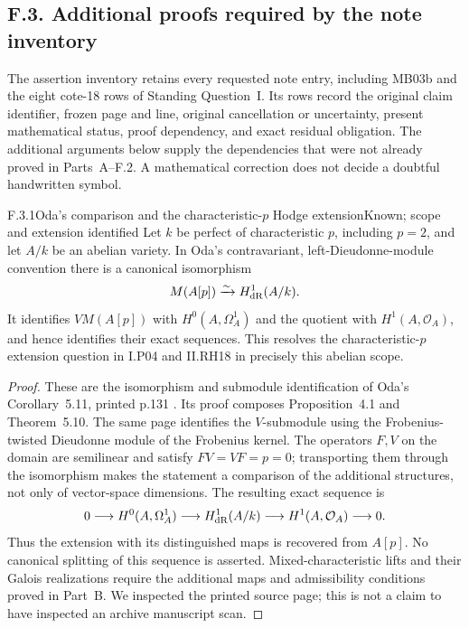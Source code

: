 \subsection{F.3. Additional proofs required by the note inventory}

The assertion inventory retains every requested note entry, including MB03b and the eight cote-18 rows of Standing Question~I. Its rows record the original claim identifier, frozen page and line, original cancellation or uncertainty, present mathematical status, proof dependency, and exact residual obligation. The additional arguments below supply the dependencies that were not already proved in Parts~A--F.2. A mathematical correction does not decide a doubtful handwritten symbol.

\begin{result}{F.3.1}{Oda's comparison and the characteristic-$p$ Hodge extension}{Known; scope and extension identified}
Let $k$ be perfect of characteristic $p$, including $p=2$, and let $A/k$ be an abelian variety. In Oda's contravariant, left-Dieudonne-module convention there is a canonical isomorphism
\[
 M(A[p])\xrightarrow{\sim}H^1_{\mathrm{dR}}(A/k).
\]
It identifies $VM(A[p])$ with $H^0(A,\Omega_A^1)$ and the quotient with $H^1(A,\mathcal O_A)$, and hence identifies their exact sequences. This resolves the characteristic-$p$ extension question in I.P04 and II.RH18 in precisely this abelian scope.
\end{result}
\begin{proof}
These are the isomorphism and submodule identification of Oda's Corollary~5.11, printed p.131 \cite{AuditOda1969}. Its proof composes Proposition~4.1 and Theorem~5.10. The same page identifies the $V$-submodule using the Frobenius-twisted Dieudonne module of the Frobenius kernel. The operators $F,V$ on the domain are semilinear and satisfy $FV=VF=p=0$; transporting them through the isomorphism makes the statement a comparison of the additional structures, not only of vector-space dimensions. The resulting exact sequence is
\[
0\longrightarrow H^0(A,\Omega_A^1)\longrightarrow H^1_{\mathrm{dR}}(A/k)
\longrightarrow H^1(A,\mathcal O_A)\longrightarrow0.
\]
Thus the extension with its distinguished maps is recovered from $A[p]$. No canonical splitting of this sequence is asserted. Mixed-characteristic lifts and their Galois realizations require the additional maps and admissibility conditions proved in Part~B. We inspected the printed source page; this is not a claim to have inspected an archive manuscript scan.
\end{proof}

